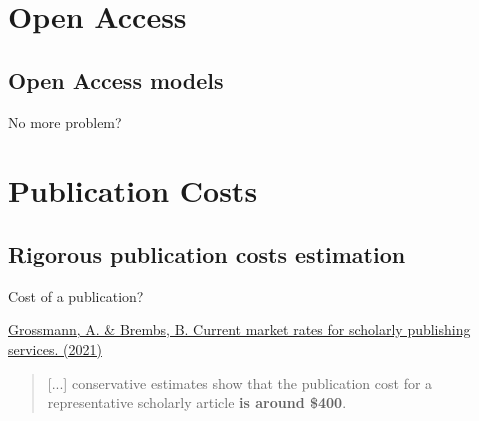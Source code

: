 \documentclass[10pt,compress,serif,aspectratio=169]{beamer}
\newcommand{\fig}[2]{\centering{\texttt{[image: \#2]}}}
\begin{document}


\section{Open Access}
\subsection{Open Access models}

\begin{frame}[t]{No more problem?}
\fig{.6}{cash_flow_GOA}
\end{frame}


\section{Publication Costs}
\subsection{Rigorous publication costs estimation}
\begin{frame}[t]{Cost of a publication?}

\href{https://doi.org/10.12688/f1000research.27468.2}{Grossmann, A. \& Brembs, B. Current market rates for scholarly publishing services. (2021)} 
\begin{quote}
  \vspace{.5cm}
   [...] conservative estimates show that the publication cost for a representative scholarly article \textbf{is around \$400}.
 \end{quote}

 \pause
 \vfill
{}
\end{frame}

\end{document}
